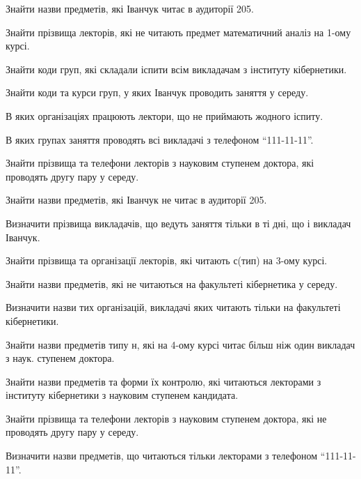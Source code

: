\begin{card}
    \item Знайти назви предметів, які Іванчук читає в аудиторії 205.
    \item Знайти прізвища лекторів, які не читають предмет математичний аналіз на 1-ому курсі.
    \item Знайти коди груп, які складали іспити всім викладачам з інституту кібернетики.
\end{card}

\begin{card}
    \item Знайти коди та курси груп, у яких Іванчук проводить заняття у середу.
    \item В яких організаціях працюють лектори, що не приймають жодного іспиту.
    \item В яких групах заняття проводять всі викладачі з телефоном ``111-11-11''.
\end{card}

\begin{card}
    \item Знайти прізвища та телефони лекторів з науковим ступенем доктора, які проводять другу пару у середу. 
    \item Знайти назви предметів, які Іванчук не читає в аудиторії 205.
    \item Визначити прізвища викладачів, що ведуть заняття  тільки в ті дні, що і викладач Іванчук.
\end{card}

\begin{card}
    \item Знайти прізвища та організації лекторів, які читають с (тип) на 3-ому курсі.
    \item Знайти назви предметів, які не читаються на факультеті кібернетика у середу.
    \item Визначити назви тих організацій, викладачі яких читають тільки на факультеті  кібернетики. 
    \item Знайти назви предметів типу н, які на 4-ому курсі читає більш ніж один викладач з наук. ступенем доктора.
\end{card}

\begin{card}
    \item Знайти назви предметів та форми їх контролю, які читаються лекторами з інституту кібернетики з науковим ступенем кандидата.
    \item Знайти прізвища та телефони лекторів з науковим ступенем доктора, які не проводять другу пару у середу.
    \item Визначити назви предметів, що читаються тільки лекторами з телефоном ``111-11-11''.
\end{card}

